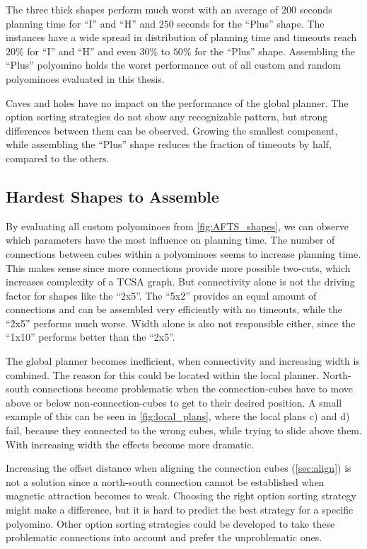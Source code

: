 The three thick shapes perform much worst with an average of $200$ seconds planning time for ``I'' and ``H'' and $250$ seconds for the ``Plus'' shape.
The instances have a wide spread in distribution of planning time and timeouts reach $20\%$ for ``I'' and ``H'' and even $30\%$ to $50\%$ for the ``Plus'' shape.
Assembling the ``Plus'' polyomino holds the worst performance out of all custom and random polyominoes evaluated in this thesis.

Caves and holes have no impact on the performance of the global planner.
The option sorting strategies do not show any recognizable pattern, but strong differences between them can be observed.
Growing the smallest component, while assembling the ``Plus'' shape reduces the fraction of timeouts by half, compared to the others.


\subsection{Hardest Shapes to Assemble}
\label{sec:hard_shape}

By evaluating all custom polyominoes from \autoref{fig:AFTS_shapes}, we can observe which parameters have the most influence on planning time.
The number of connections between cubes within a polyominoes seems to increase planning time.
This makes sense since more connections provide more possible two-cuts, which increases complexity of a TCSA graph.
But connectivity alone is not the driving factor for shapes like the ``2x5''.
The ``5x2'' provides an equal amount of connections and can be assembled very efficiently with no timeouts, while the ``2x5'' performs much worse.
Width alone is also not responsible either, since the ``1x10'' performs better than the ``2x5''.

The global planner becomes inefficient, when connectivity and increasing width is combined.
The reason for this could be located within the local planner.
North-south connections become problematic when the connection-cubes have to move above or below non-connection-cubes to get to their desired position.
A small example of this can be seen in \autoref{fig:local_plans}, where the local plans c) and d) fail, because they connected to the wrong cubes, while trying to slide above them.
With increasing width the effects become more dramatic.

Increasing the offset distance when aligning the connection cubes (\autoref{sec:align}) is not a solution since a north-south connection cannot be established when magnetic attraction becomes to weak.
Choosing the right option sorting strategy might make a difference, but it is hard to predict the best strategy for a specific polyomino.
Other option sorting strategies could be developed to take these problematic connections into account and prefer the unproblematic ones.



